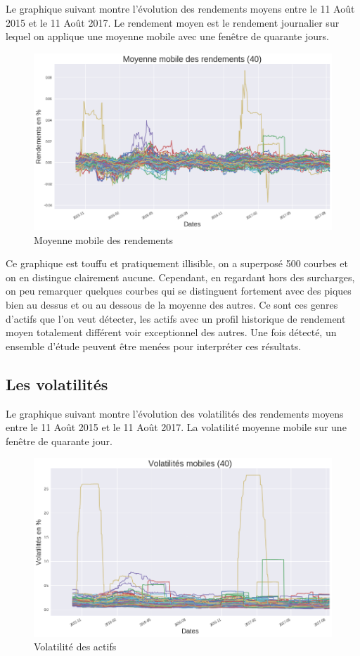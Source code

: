 Le graphique suivant montre l'évolution des rendements moyens entre le 11 Août 2015 et le 11 Août 2017. Le rendement moyen est le rendement journalier sur lequel on applique une moyenne mobile avec une fenêtre de quarante jours.

\begin{figure}[H]
\centering
\caption{Moyenne mobile des rendements}
   \includegraphics[scale=0.5]{img/rendements.png}
\end{figure}

Ce graphique est touffu et pratiquement illisible, on a superposé 500 courbes et on en distingue clairement aucune. Cependant, en regardant hors des surcharges, on peu remarquer quelques courbes qui se distinguent fortement avec des piques bien au dessus et ou au dessous de la moyenne des autres. Ce sont ces genres d'actifs que l'on veut détecter, les actifs avec un profil historique de rendement moyen totalement différent voir exceptionnel des autres. Une fois détecté, un ensemble d'étude peuvent être menées pour interpréter ces résultats.

\subsection{Les volatilités}

Le graphique suivant montre l'évolution des volatilités des rendements moyens entre le 11 Août 2015 et le 11 Août 2017. La volatilité moyenne mobile sur une fenêtre de quarante jour.

\begin{figure}[H]
\centering
\caption{Volatilité des actifs}
   \includegraphics[scale=0.5]{img/volatilites.png}
\end{figure}


